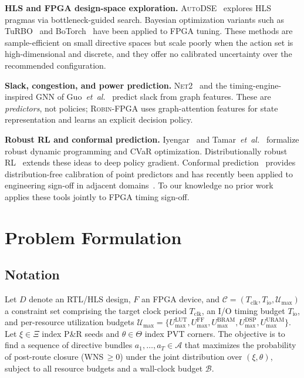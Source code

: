 \documentclass[journal,onecolumn=false]{IEEEtran}
\begin{document}
\textbf{HLS and FPGA design-space exploration.} \textsc{AutoDSE}~\cite{sohrabizadeh2022autodse} explores HLS pragmas via bottleneck-guided search. Bayesian optimization variants such as TuRBO~\cite{eriksson2019turbo} and BoTorch~\cite{balandat2020botorch} have been applied to FPGA tuning. These methods are sample-efficient on small directive spaces but scale poorly when the action set is high-dimensional and discrete, and they offer no calibrated uncertainty over the recommended configuration.

\textbf{Slack, congestion, and power prediction.} \textsc{Net2}~\cite{barboza2019net2} and the timing-engine-inspired GNN of Guo~\emph{et~al.}\ \cite{guo2022timing} predict slack from graph features. These are \emph{predictors}, not policies; \textsc{Robin-FPGA} uses graph-attention features for state representation and learns an explicit decision policy.

\textbf{Robust RL and conformal prediction.} Iyengar~\cite{iyengar2005robust} and Tamar~\emph{et~al.}\ \cite{tamar2015cvar} formalize robust dynamic programming and CVaR optimization. Distributionally robust RL~\cite{rigter2022rambo,sinha2017certifying} extends these ideas to deep policy gradient. Conformal prediction~\cite{vovk2022random,angelopoulos2023conformal} provides distribution-free calibration of point predictors and has recently been applied to engineering sign-off in adjacent domains~\cite{angelopoulos2024conformal}. To our knowledge no prior work applies these tools jointly to FPGA timing sign-off.

\section{Problem Formulation}
\label{sec:formulation}

\subsection{Notation}
Let $D$ denote an RTL/HLS design, $F$ an FPGA device, and $\mathcal{C} = (T_{\text{clk}}, T_{\text{io}}, \mathcal{U}_{\max})$ a constraint set comprising the target clock period $T_{\text{clk}}$, an I/O timing budget $T_{\text{io}}$, and per-resource utilization budgets $\mathcal{U}_{\max} = \{U_{\max}^{\text{LUT}}, U_{\max}^{\text{FF}}, U_{\max}^{\text{BRAM}}, U_{\max}^{\text{DSP}}, U_{\max}^{\text{URAM}}\}$. Let $\xi \in \Xi$ index P\&R seeds and $\theta \in \Theta$ index PVT corners. The objective is to find a sequence of directive bundles $a_1, \ldots, a_T \in \mathcal{A}$ that maximizes the probability of post-route closure (WNS\,$\geq 0$) under the joint distribution over $(\xi, \theta)$, subject to all resource budgets and a wall-clock budget $\mathcal{B}$.
\end{document}
